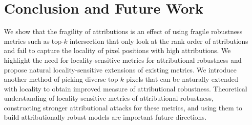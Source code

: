 \documentclass[letterpaper]{article} %
\begin{document}
%
%
%
%

\section{Conclusion and Future Work} \label{sec:conclusion}
We show that the fragility of attributions is an effect of using fragile robustness metrics such as top-$k$ intersection that only look at the rank order of attributions and fail to capture the locality of pixel positions with high attributions. We highlight the need for locality-sensitive metrics for attributional robustness and propose natural locality-sensitive extensions of existing metrics. We introduce another method of picking diverse top-$k$ pixels that can be naturally extended with locality to obtain improved measure of attributional robustness. Theoretical understanding of locality-sensitive metrics of attributional robustness, constructing stronger attributional attacks for these metrics, and using them to build attributionally robust models are important future directions. 
\end{document}
